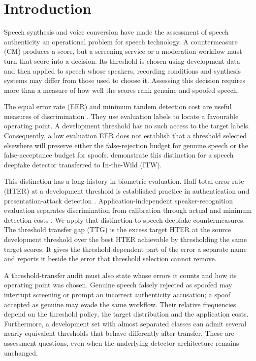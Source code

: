 \section{Introduction}
\label{sec:intro}
Speech synthesis and voice conversion have made the assessment of speech authenticity an operational problem for
speech technology. A countermeasure (CM) produces a score, but a screening service or a moderation workflow must turn
that score into a decision. Its threshold is chosen using development data and then applied to speech whose speakers,
recording conditions and synthesis systems may differ from those used to choose it. Assessing this decision requires
more than a measure of how well the scores rank genuine and spoofed speech.

The equal error rate (EER) and minimum tandem detection cost are useful measures of discrimination
\citep{kinnunen18_tdcf,wang20_asvspoof2019,liu23_asvspoof2021}. They use evaluation labels to locate a favourable
operating point. A development threshold has no such access to the target labels. Consequently, a low evaluation EER
does not establish that a threshold selected elsewhere will preserve either the false-rejection budget for genuine
speech or the false-acceptance budget for spoofs. \citet{zhou26_eer_hides} demonstrate this distinction for a speech
deepfake detector transferred to In-the-Wild (ITW).

This distinction has a long history in biometric evaluation. Half total error rate (HTER) at a development threshold
is established practice in authentication and presentation-attack detection
\citep{bengio04_hter,chingovska12_lbp,korshunov16_crossdb}. Application-independent speaker-recognition evaluation
separates discrimination from calibration through actual and minimum detection costs
\citep{brummer06_calibration,vanleeuwen07_intro}. We apply that distinction to speech deepfake countermeasures. The
threshold transfer gap (TTG) is the excess target HTER at the source development threshold over the best HTER achievable
by thresholding the same target scores. It gives the threshold-dependent part of the error a separate name and
reports it beside the error that threshold selection cannot remove.

A threshold-transfer audit must also state whose errors it counts and how its operating point was chosen. Genuine
speech falsely rejected as spoofed may interrupt screening or prompt an incorrect authenticity accusation; a spoof
accepted as genuine may evade the same workflow. Their relative frequencies depend on the threshold policy, the
target distribution and the application costs. Furthermore, a development set with almost separated classes can
admit several nearly equivalent thresholds that behave differently after transfer. These are assessment questions,
even when the underlying detector architecture remains unchanged.

